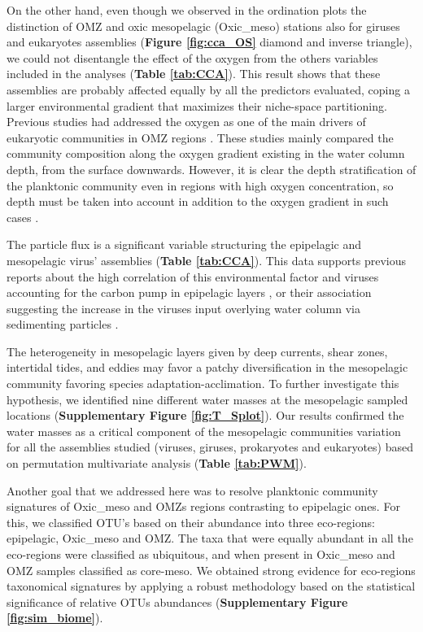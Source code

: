 \documentclass[fleqn,10pt]{wlscirep}
\begin{document}
On the other hand, even though we observed in the ordination plots the distinction of OMZ and oxic mesopelagic (Oxic\_meso) stations also for giruses and eukaryotes assemblies (\textbf{Figure \ref{fig:cca_OS}} diamond and inverse triangle), we could not disentangle the effect of the oxygen from the others variables included in the analyses (\textbf{Table \ref{tab:CCA}}). This result shows that these assemblies are probably affected equally by all the predictors evaluated, coping a larger environmental gradient that maximizes their niche-space partitioning. Previous studies had addressed the oxygen as one of the main drivers of eukaryotic communities in OMZ regions \cite{de_la_iglesia_distinct_2020, orsi_effect_2012, parris_microbial_2014}. These studies mainly compared the community composition along the oxygen gradient existing in the water column depth, from the surface downwards. However, it is clear the depth stratification of the planktonic community even in regions with high oxygen concentration, so depth must be taken into account in addition to the oxygen gradient in such cases \cite{schnetzer_depth_2011}.

The particle flux is a significant variable structuring the epipelagic and mesopelagic virus’ assemblies (\textbf{Table \ref{tab:CCA}}). This data supports previous reports about the high correlation of this environmental factor and viruses accounting for the carbon pump in epipelagic layers \cite{guidi_plankton_2016}, or their association suggesting the increase in the viruses input overlying water column via sedimenting particles \cite{parada_viral_2007}.

The heterogeneity in mesopelagic layers given by deep currents, shear zones, intertidal tides, and eddies may favor a patchy diversification in the mesopelagic community favoring species adaptation-acclimation. To further investigate this hypothesis, we identified nine different water masses at the mesopelagic sampled locations (\textbf{Supplementary Figure \ref{fig:T_Splot}}). Our results confirmed the water masses as a critical component of the mesopelagic communities variation for all the assemblies studied (viruses, giruses, prokaryotes and eukaryotes) based on permutation multivariate analysis (\textbf{Table \ref{tab:PWM}}).

Another goal that we addressed here was to resolve planktonic community signatures of Oxic\_meso and OMZs regions contrasting to epipelagic ones. For this, we classified OTU’s based on their abundance into three eco-regions: epipelagic, Oxic\_meso and OMZ. The taxa that were equally abundant in all the eco-regions were classified as ubiquitous, and when present in Oxic\_meso and OMZ samples classified as core-meso. We obtained strong evidence for eco-regions taxonomical signatures by applying a robust methodology based on the statistical significance of relative OTUs abundances (\textbf{Supplementary Figure \ref{fig:sim_biome}}).
\end{document}
